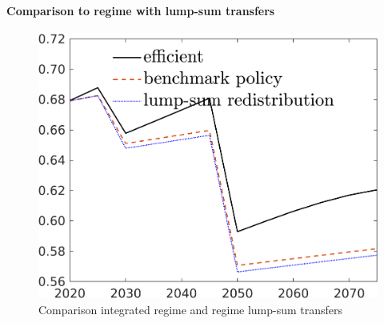 \begin{figure}[h!!]
\begin{minipage}[]{0.32\textwidth}
	\end{minipage}
\end{figure}



\paragraph{Comparison to regime with lump-sum transfers}\label{par:comp_lumpsum}


\begin{figure}[h!!]
	\centering
	\caption{Comparison integrated regime and regime lump-sum transfers}\label{fig:bench_lumpsum}
	
	\begin{minipage}[]{0.32\textwidth}
		\includegraphics[width=1\textwidth]{../../codding_model/own_basedOnFried/optimalPol_190722_tidiedUp/figures/all_July22/C_CompEffOPT_T_NoTaus_pol4_spillover0_noskill0_sep1_xgrowth0_etaa0.79_lgd1_lff0.png}
	\end{minipage}
	\begin{minipage}[]{0.32\textwidth}

\end{minipage}
\end{figure}
